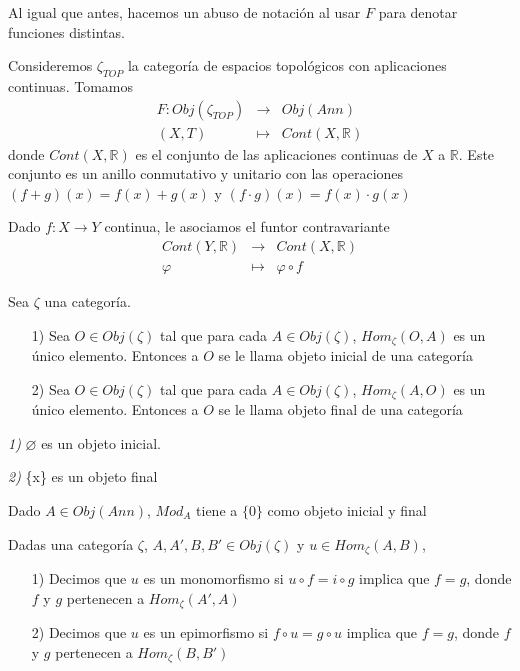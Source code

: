 \documentclass[../main.tex]{subfiles}
\begin{document}
Al igual que antes, hacemos un abuso de notación al usar $F$ para denotar funciones distintas.
\begin{example}
Consideremos $\zeta_{TOP}$ la categoría de espacios topológicos con aplicaciones continuas. Tomamos
$$\begin{array}{rcl}
    F: Obj(\zeta_{TOP})&\longrightarrow&Obj(Ann)\\
    (X,T)&\longmapsto&Cont(X,\mathbb{R})
    \end{array}$$
donde $Cont(X,\mathbb{R})$ es el conjunto de las aplicaciones continuas de $X$ a $\mathbb{R}$. Este conjunto es un anillo conmutativo y unitario con las operaciones $(f+g)(x)=f(x)+g(x)$ y $(f\cdot g)(x)=f(x)\cdot g(x)$

Dado $f:X\rightarrow Y$ continua, le asociamos el funtor contravariante
$$\begin{array}{rcl}
    Cont(Y,\mathbb{R})&\longrightarrow&Cont(X,\mathbb{R})\\
    \varphi&\longmapsto&\varphi\circ f
    \end{array}$$
\end{example}
\begin{definition} Sea $\zeta$ una categoría.\begin{itemize}
    \item [1)]Sea $O\in Obj(\zeta)$ tal que para cada $A\in Obj(\zeta)$, $Hom_{\zeta}(O,A)$ es un único elemento. Entonces a $O$ se le llama objeto inicial de una categoría
    \item [2)] Sea $O\in Obj(\zeta)$ tal que para cada $A\in Obj(\zeta)$, $Hom_{\zeta}(A,O)$ es un único elemento. Entonces a $O$ se le llama objeto final de una categoría
\end{itemize}
\end{definition}
\begin{example}
\textit{1)} $\varnothing$ es un objeto inicial.

\textit{2)} \{x\} es un objeto final

 Dado $A\in Obj(Ann)$, $Mod_A$ tiene a $\{0\}$ como objeto inicial y final
\end{example}
\begin{definition} Dadas una categoría $\zeta$, $A, A', B, B'\in Obj(\zeta)$ y $u\in Hom_{\zeta}(A,B)$, \begin{itemize}
    \item [1)] Decimos que $u$ es un monomorfismo si $u\circ f=i\circ g$ implica que $f=g$, donde $f$ y $g$ pertenecen a $Hom_{\zeta}(A',A)$
    \item[2)] Decimos que $u$ es un epimorfismo si $f\circ u=g\circ u$ implica que $f=g$, donde $f$ y $g$ pertenecen a $Hom_{\zeta}(B,B')$
\end{itemize}
\end{definition}
\end{document}
